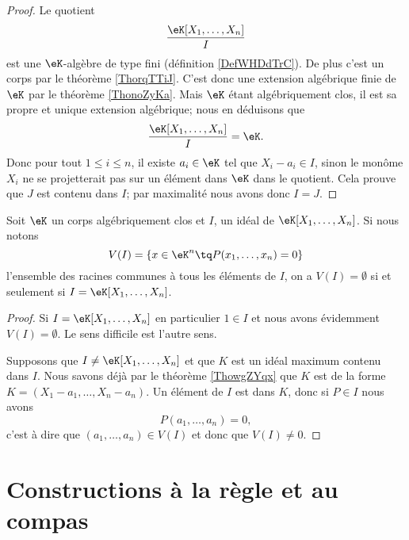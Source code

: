 \begin{proof}
    Le quotient
    \begin{equation}
        \frac{ \eK[X_1,\ldots, X_n] }{ I }
    \end{equation}
    est une \( \eK\)-algèbre de type fini (définition \ref{DefWHDdTrC}). De plus c'est un corps par le théorème \ref{ThorqTTiJ}. C'est donc une extension algébrique finie de \( \eK\) par le théorème \ref{ThonoZyKa}. Mais \( \eK\) étant algébriquement clos, il est sa propre et unique extension algébrique; nous en déduisons que
    \begin{equation}
        \frac{ \eK[X_1,\ldots, X_n] }{ I }=\eK.
    \end{equation}
    Donc pour tout \( 1\leq i\leq n\), il existe \( a_i\in \eK\) tel que \( X_i-a_i\in I\), sinon le monôme \( X_i\) ne se projetterait pas sur un élément dans \( \eK\) dans le quotient. Cela prouve que \( J\) est contenu dans \( I\); par maximalité nous avons donc \( I=J\).
\end{proof}

\begin{corollary}
    Soit \( \eK\) un corps algébriquement clos et \( I\), un idéal de \( \eK[X_1,\ldots, X_n]\). Si nous notons
    \begin{equation}
        V(I)=\{ x\in \eK^n\tq P(x_1,\ldots, x_n)=0 \}
    \end{equation}
    l'ensemble des racines communes à tous les éléments de \( I\), on a \( V(I)=\emptyset\) si et seulement si \( I=\eK[X_1,\ldots, X_n]\).
\end{corollary}

\begin{proof}
    Si \( I=\eK[X_1,\ldots, X_n]\) en particulier \( 1\in I\) et nous avons évidemment \( V(I)=\emptyset\). Le sens difficile est l'autre sens.

    Supposons que \( I\neq \eK[X_1,\ldots, X_n]\) et que \( K\) est un idéal maximum contenu dans \( I\). Nous savons déjà par le théorème \ref{ThowgZYqx} que \( K\) est de la forme \( K=(X_1-a_1,\ldots, X_n-a_n)\). Un élément de \( I\) est dans \( K\), donc si \( P\in I\) nous avons
    \begin{equation}
        P(a_1,\ldots, a_n)=0,
    \end{equation}
    c'est à dire que \( (a_1,\ldots, a_n)\in V(I)\) et donc que \( V(I)\neq 0\).
\end{proof}

\section{Constructions à la règle et au compas}


